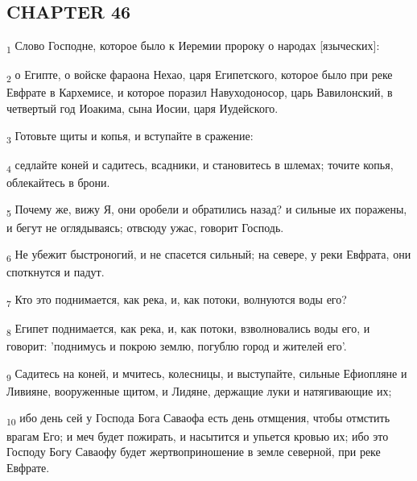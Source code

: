 \subsection{CHAPTER 46}
\begin{tcolorbox}
\textsubscript{1} Слово Господне, которое было к Иеремии пророку о народах [языческих]:
\end{tcolorbox}
\begin{tcolorbox}
\textsubscript{2} о Египте, о войске фараона Нехао, царя Египетского, которое было при реке Евфрате в Кархемисе, и которое поразил Навуходоносор, царь Вавилонский, в четвертый год Иоакима, сына Иосии, царя Иудейского.
\end{tcolorbox}
\begin{tcolorbox}
\textsubscript{3} Готовьте щиты и копья, и вступайте в сражение:
\end{tcolorbox}
\begin{tcolorbox}
\textsubscript{4} седлайте коней и садитесь, всадники, и становитесь в шлемах; точите копья, облекайтесь в брони.
\end{tcolorbox}
\begin{tcolorbox}
\textsubscript{5} Почему же, вижу Я, они оробели и обратились назад? и сильные их поражены, и бегут не оглядываясь; отвсюду ужас, говорит Господь.
\end{tcolorbox}
\begin{tcolorbox}
\textsubscript{6} Не убежит быстроногий, и не спасется сильный; на севере, у реки Евфрата, они споткнутся и падут.
\end{tcolorbox}
\begin{tcolorbox}
\textsubscript{7} Кто это поднимается, как река, и, как потоки, волнуются воды его?
\end{tcolorbox}
\begin{tcolorbox}
\textsubscript{8} Египет поднимается, как река, и, как потоки, взволновались воды его, и говорит: 'поднимусь и покрою землю, погублю город и жителей его'.
\end{tcolorbox}
\begin{tcolorbox}
\textsubscript{9} Садитесь на коней, и мчитесь, колесницы, и выступайте, сильные Ефиопляне и Ливияне, вооруженные щитом, и Лидяне, держащие луки и натягивающие их;
\end{tcolorbox}
\begin{tcolorbox}
\textsubscript{10} ибо день сей у Господа Бога Саваофа есть день отмщения, чтобы отмстить врагам Его; и меч будет пожирать, и насытится и упьется кровью их; ибо это Господу Богу Саваофу будет жертвоприношение в земле северной, при реке Евфрате.
\end{tcolorbox}
